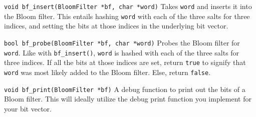 \begin{funcdoc}{\texttt{void bf\_insert(BloomFilter *bf, char *word)}}
  Takes \texttt{word} and inserts it into the Bloom filter. This entails hashing
  \texttt{word} with each of the three salts for three indices, and setting the
  bits at those indices in the underlying bit vector.
\end{funcdoc}

\begin{funcdoc}{\texttt{bool bf\_probe(BloomFilter *bf, char *word)}}
  Probes the Bloom filter for \texttt{word}. Like with \texttt{bf\_insert()},
  \texttt{word} is hashed with each of the three salts for three indices. If all
  the bits at those indices are set, return \texttt{true} to signify that
  \texttt{word} was most likely added to the Bloom filter. Else, return
  \texttt{false}.
\end{funcdoc}

\begin{funcdoc}{\texttt{void bf\_print(BloomFilter *bf)}}
  A debug function to print out the bits of a Bloom filter. This will ideally
  utilize the debug print function you implement for your bit vector.
\end{funcdoc}
